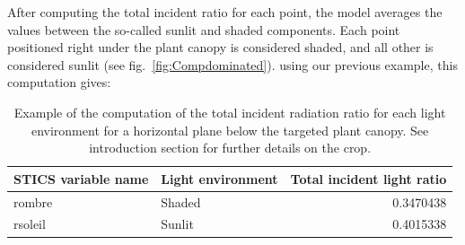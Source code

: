 \documentclass[
]{book}
\newenvironment{Shaded}{\begin{snugshade}}{\end{snugshade}}
\newcommand{\DataTypeTok}[1]{\textcolor[rgb]{0.13,0.29,0.53}{#1}}
\newcommand{\KeywordTok}[1]{\textcolor[rgb]{0.13,0.29,0.53}{\textbf{#1}}}
\newcommand{\NormalTok}[1]{#1}
\newcommand{\OperatorTok}[1]{\textcolor[rgb]{0.81,0.36,0.00}{\textbf{#1}}}
\newcommand{\StringTok}[1]{\textcolor[rgb]{0.31,0.60,0.02}{#1}}
\begin{document}
After computing the total incident ratio for each point, the model averages the values between the so-called sunlit and shaded components. Each point positioned right under the plant canopy is considered shaded, and all other is considered sunlit (see fig.~\ref{fig:Compdominated}). using our previous example, this computation gives:

\begin{Shaded}
\end{Shaded}

\begin{table}

\caption{\label{tab:unnamed-chunk-6}Example of the computation of the total incident radiation ratio for each light environment for a horizontal plane below the targeted plant canopy. See introduction section for further details on the crop.}
\centering
\begin{tabular}[t]{l|l|r}
\hline
STICS variable name & Light environment & Total incident light ratio\\
\hline
rombre & Shaded & 0.3470438\\
\hline
rsoleil & Sunlit & 0.4015338\\
\hline
\end{tabular}
\end{table}
\end{document}
